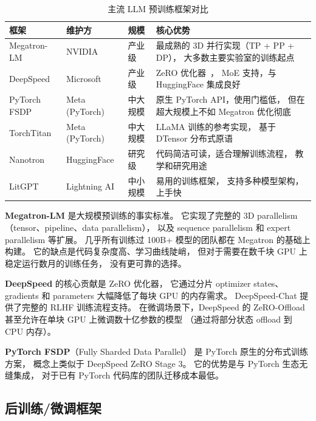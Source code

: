 \begin{table}[H]
\centering\small
\renewcommand{\arraystretch}{1.3}
\caption{主流 LLM 预训练框架对比}\label{tab:training-frameworks}
\begin{tabularx}{\linewidth}{l l l >{\raggedright\arraybackslash}X}
\toprule
\rowcolor{figLightGray}
\textbf{框架} & \textbf{维护方} & \textbf{规模} & \textbf{核心优势} \\
\midrule
Megatron-LM & NVIDIA & 产业级 &
  最成熟的 3D 并行实现（TP + PP + DP），
  大多数主要实验室的训练起点 \\
DeepSpeed   & Microsoft & 产业级 &
  ZeRO 优化器~\cite{rajbhandari2020zero}，
  MoE 支持，与 HuggingFace 集成良好 \\
PyTorch FSDP & Meta (PyTorch) & 中大规模 &
  原生 PyTorch API，使用门槛低，
  但在超大规模上不如 Megatron 优化彻底 \\
TorchTitan  & Meta (PyTorch) & 中大规模 &
  LLaMA 训练的参考实现，
  基于 DTensor 分布式原语 \\
Nanotron    & HuggingFace & 研究级 &
  代码简洁可读，适合理解训练流程，
  教学和研究用途 \\
LitGPT      & Lightning AI & 中小规模 &
  易用的训练框架，
  支持多种模型架构，上手快 \\
\bottomrule
\end{tabularx}
\end{table}

\textbf{Megatron-LM} 是大规模预训练的事实标准。
它实现了完整的 3D parallelism（tensor、pipeline、data parallelism），
以及 sequence parallelism 和 expert parallelism 等扩展。
几乎所有训练过 100B+ 模型的团队都在 Megatron 的基础上构建。
它的缺点是代码复杂度高、学习曲线陡峭，
但对于需要在数千块 GPU 上稳定运行数月的训练任务，
没有更可靠的选择。

\textbf{DeepSpeed} 的核心贡献是 ZeRO 优化器，
它通过分片 optimizer states、gradients 和 parameters
大幅降低了每块 GPU 的内存需求。
DeepSpeed-Chat 提供了完整的 RLHF 训练流程支持。
在微调场景下，DeepSpeed 的 ZeRO-Offload
甚至允许在单块 GPU 上微调数十亿参数的模型
（通过将部分状态 offload 到 CPU 内存）。

\textbf{PyTorch FSDP}（Fully Sharded Data Parallel）
是 PyTorch 原生的分布式训练方案，
概念上类似于 DeepSpeed ZeRO Stage 3。
它的优势是与 PyTorch 生态无缝集成，
对于已有 PyTorch 代码库的团队迁移成本最低。

\subsection{后训练/微调框架}


